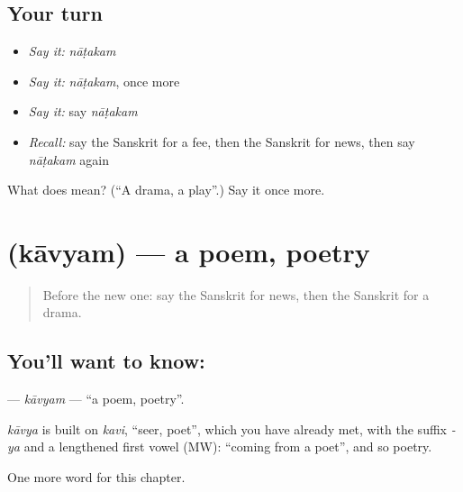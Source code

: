 \subsection*{Your turn}
\begin{itemize}
\raggedright
  \item \emph{Say it:} \emph{nāṭakam}
  \item \emph{Say it:} \emph{nāṭakam}, once more
  \item \emph{Say it:} say \emph{nāṭakam}
  \item \emph{Recall:} say the Sanskrit for a fee, then the Sanskrit for news, then say \emph{nāṭakam} again
\end{itemize}

\begin{tcolorbox}[breakable,colback=teal!4,colframe=teal!35!black,title={Before you move on}]
What does  mean? (\textquotedblleft{}A drama, a play\textquotedblright{}.) Say it once more.
\end{tcolorbox}
\section[\texorpdfstring{\sk{काव्यम्} (kāvyam)}{काव्यम् (kāvyam)}]{ (kāvyam) — a poem, poetry}

\label{lesson:SA-C249-kavyam}



\begin{quote}
Before the new one: say the Sanskrit for news, then the Sanskrit for a drama.
\end{quote}

\subsection*{You'll want to know: }
\textbf{} — \emph{kāvyam} — \textquotedblleft{}a poem, poetry\textquotedblright{}.

\begin{cousinweb}
\emph{kāvya} is built on \emph{kavi}, \textquotedblleft{}seer, poet\textquotedblright{}, which you have already met, with the suffix \emph{-ya} and a lengthened first vowel (MW): \textquotedblleft{}coming from a poet\textquotedblright{}, and so poetry.
\end{cousinweb}

\begin{grammarlens}[title={What you've built}]
One more word for this chapter.
\end{grammarlens}

